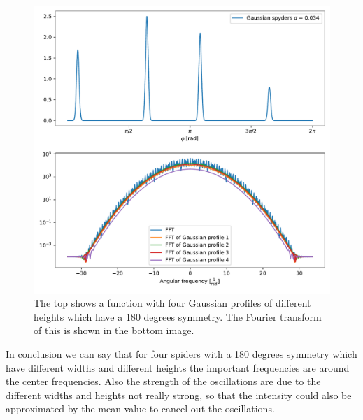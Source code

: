 \begin{figure}[H]
	\centering
		\includegraphics[width=1.0\textwidth]{pics/Gaussian_fourheightspyders.pdf}
		\caption{The top shows a function with four Gaussian profiles of different heights which have a 180 degrees symmetry. The Fourier transform of this is shown in the bottom image.}
		\label{fig:Gaussian_fourheightspyders}
\end{figure}
In conclusion we can say that for four spiders with a 180 degrees symmetry which have different widths and different heights the important frequencies are around the center frequencies. Also the strength of the oscillations are due to the different widths and heights not really strong, so that the intensity could also be approximated by the mean value to cancel out the oscillations.  

